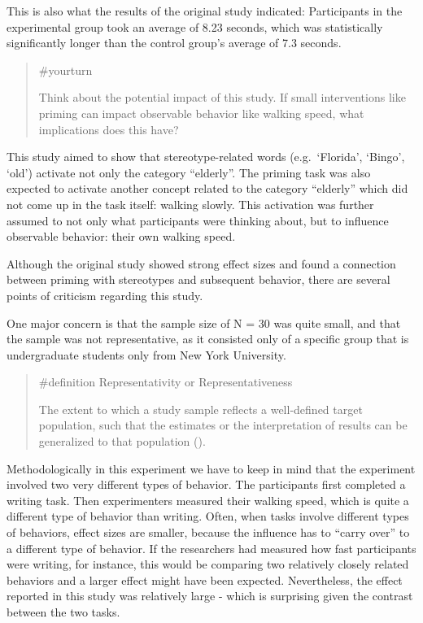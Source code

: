 \documentclass[
  letterpaper,
]{book}
\begin{document}
This is also what the results of the original study indicated:
Participants in the experimental group took an average of 8.23 seconds,
which was statistically significantly longer than the control group's
average of 7.3 seconds.

\begin{quote}
{\#yourturn}

Think about the potential impact of this study. If small interventions
like priming can impact observable behavior like walking speed, what
implications does this have?
\end{quote}

This study aimed to show that stereotype-related words (e.g.~`Florida',
`Bingo', `old') activate not only the category ``elderly''. The priming
task was also expected to activate another concept related to the
category ``elderly'' which did not come up in the task itself: walking
slowly. This activation was further assumed to not only what
participants were thinking about, but to influence observable behavior:
their own walking speed.

Although the original study showed strong effect sizes and found a
connection between priming with stereotypes and subsequent behavior,
there are several points of criticism regarding this study.

One major concern is that the sample size of N = 30 was quite small, and
that the sample was not representative, as it consisted only of a
specific group that is undergraduate students only from New York
University.

\begin{quote}
\label{def-representativity}{\#definition}
Representativity or Representativeness

The extent to which a study sample reflects a well-defined target
population, such that the estimates or the interpretation of results can
be generalized to that population
().
\end{quote}

Methodologically in this experiment we have to keep in mind that the
experiment involved two very different types of behavior. The
participants first completed a writing task. Then experimenters measured
their walking speed, which is quite a different type of behavior than
writing. Often, when tasks involve different types of behaviors, effect
sizes are smaller, because the influence has to ``carry over'' to a
different type of behavior. If the researchers had measured how fast
participants were writing, for instance, this would be comparing two
relatively closely related behaviors and a larger effect might have been
expected. Nevertheless, the effect reported in this study was relatively
large - which is surprising given the contrast between the two tasks.
\end{document}
